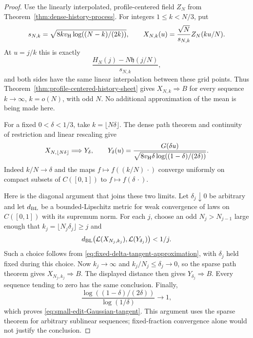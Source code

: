 \documentclass[11pt,letterpaper]{article}
\begin{document}
\begin{proof}
Use the linearly interpolated, profile-centered field $Z_N$
from Theorem~\ref{thm:dense-history-process}. For integers
$1\le k<N/3$, put
\[
 s_{N,k}=\sqrt{8kv_{\rm H}\log((N-k)/(2k))},\qquad
 X_{N,k}(u)=\frac{\sqrt N}{s_{N,k}}Z_N(ku/N).
\]
At $u=j/k$ this is exactly
\[
 \frac{H_N(j)-N\mathfrak h(j/N)}{s_{N,k}},
\]
and both sides have the same linear interpolation between
these grid points. Thus
Theorem~\ref{thm:profile-centered-history-sheet} gives
$X_{N,k}\Longrightarrow B$ for every sequence
$k\to\infty$, $k=o(N)$, with odd $N$.
No additional approximation of the mean is being made here.

For a fixed $0<\delta<1/3$, take $k=\lfloor N\delta\rfloor$.
The dense path theorem and continuity of restriction and
linear rescaling give
\begin{equation}\label{eq:fixed-delta-tangent-approximation}
 X_{N,\lfloor N\delta\rfloor}
       \Longrightarrow Y_\delta,\qquad
 Y_\delta(u)=
 \frac{G(\delta u)}
 {\sqrt{8v_{\rm H}\delta\log((1-\delta)/(2\delta))}} .
\end{equation}
Indeed $k/N\to\delta$ and the maps
$f\mapsto f((k/N)\,\cdot)$ converge uniformly on compact
subsets of $C([0,1])$ to $f\mapsto f(\delta\,\cdot)$.

Here is the diagonal argument that joins these two limits.
Let $\delta_j\downarrow0$ be arbitrary and let $d_{\rm BL}$
be a bounded-Lipschitz metric for weak convergence of laws
on $C([0,1])$ with its supremum norm.
For each $j$, choose an odd $N_j>N_{j-1}$ large enough that
$k_j=\lfloor N_j\delta_j\rfloor\ge j$ and
\[
 d_{\rm BL}\bigl(\mathcal L(X_{N_j,k_j}),
                         \mathcal L(Y_{\delta_j})\bigr)<1/j.
\]
Such a choice follows from
\eqref{eq:fixed-delta-tangent-approximation}, with $\delta_j$
held fixed during this choice. Now $k_j\to\infty$ and
$k_j/N_j\le\delta_j\to0$, so the sparse path theorem gives
$X_{N_j,k_j}\Longrightarrow B$. The displayed distance then
gives $Y_{\delta_j}\Longrightarrow B$.
Every sequence tending to zero has the same conclusion.
Finally,
\[
 \frac{\log((1-\delta)/(2\delta))}{\log(1/\delta)}
                      \longrightarrow1,
\]
which proves \eqref{eq:small-edit-Gaussian-tangent}.
This argument uses the sparse theorem for arbitrary
sublinear sequences; fixed-fraction convergence alone
would not justify the conclusion.


\end{proof}
\end{document}
